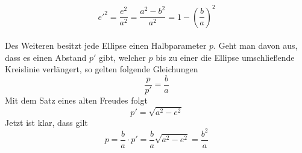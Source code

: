 \begin{equation}
	e'^2=\frac{e^2}{a^2}=\frac{a^2-b^2}{a^2}=1-\left(\frac{b}{a}\right)^2 
	\label{equation_kepler_b}
\end{equation} 
\\Des Weiteren besitzt jede Ellipse einen Halbparameter \ensuremath{p}. Geht man davon aus, dass es einen Abstand \ensuremath{p'} gibt, welcher \ensuremath{p} bis zu einer die Ellipse umschließende Kreislinie verlängert, so gelten folgende Gleichungen
\begin{equation}
	\frac{p}{p'}=\frac{b}{a}
	\label{equation_kepler_p}
\end{equation}
Mit dem Satz eines alten Freudes folgt
\begin{equation}
p' = \sqrt{a^2-e^2}
\end{equation}
Jetzt ist klar, dass gilt
\begin{equation}
p=\frac{b}{a} \cdot p'= \frac{b}{a} \sqrt{a^2-e^2} = \frac{b^2}{a}
\label{equation_kepler_simple_p}
\end{equation}

